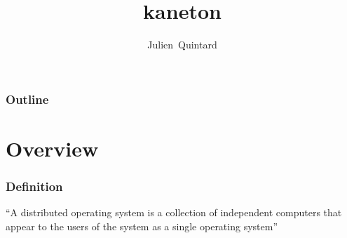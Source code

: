 
%
%



%
%

\title{kaneton}

%
%

\author
{
  Julien~Quintard
}

%
%



%
%

\begin{frame}
  \titlepage

  \begin{center}
    \logos
  \end{center}
\end{frame}

%
%

\begin{frame}
  \frametitle{Outline}
  \tableofcontents
\end{frame}

%
%

\section{Overview}


\begin{frame}
  \frametitle{Definition}

  ``A distributed operating system is a collection of independent
  computers that appear to the users of the system as a single operating
  system''
\end{frame}


